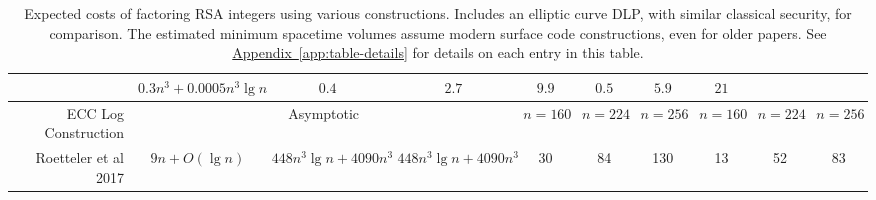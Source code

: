 \documentclass[superscriptaddress,notitlepage,longbibliography]{revtex4-1}
\theoremstyle{definition}
\theoremstyle{definition}
\DeclareRobustCommand{\app}[1]{\hyperref[app:#1]{Appendix~\ref*{app:#1}}}
\begin{document}
\begin{table}[p]
{\begin{tabular}{r||c|c|c||c|c|c||c|c|c}
    &{\boldmath $0.3 n^3 + 0.0005 n^3 \lg n$}
        &{\boldmath $0.4$}
        &{\boldmath $2.7$}
        &{\boldmath $9.9$}
            &{\boldmath $0.5$}
            &{\boldmath $5.9$}
            &{\boldmath $21$}
                \\
\hline
ECC Log Construction
    &\multicolumn{3}{|c||}{Asymptotic}
        &$n=160$ &$n=224$ &$n=256$
            &$n=160$ &$n=224$ &$n=256$
                \\
\hline
Roetteler et al 2017 \cite{roetteler2017quantum}
    &$9n + O(\lg n)$
    &$448 n^3 \lg n + 4090 n^3$
    &$448 n^3 \lg n + 4090 n^3$
        &30
        &84
        &130
            &13
            &52
            &83
  \end{tabular}
  }
  \caption{
    Expected costs of factoring RSA integers using various constructions.
    Includes an elliptic curve DLP, with similar classical security, for comparison.
    The estimated minimum spacetime volumes assume modern surface code constructions, even for older papers.
    See \app{table-details} for details on each entry in this table.
  }
\end{table}
\end{document}
